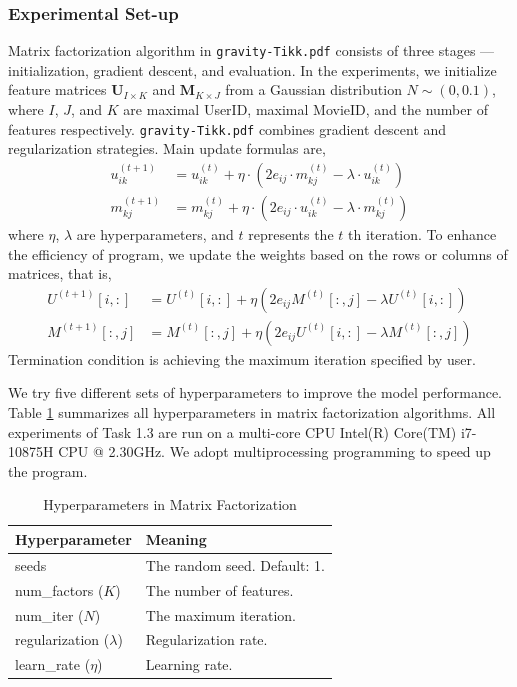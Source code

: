 \documentclass{article}
\begin{document}
\subsubsection{Experimental Set-up}
Matrix factorization algorithm in \texttt{gravity-Tikk.pdf} consists of three stages --- initialization, gradient descent, and evaluation. In the experiments, we initialize feature matrices $\mathbf{U}_{I\times K}$ and $\mathbf{M}_{K\times J}$ from a Gaussian distribution $N\sim (0, 0.1)$, where $I$, $J$, and $K$ are maximal UserID, maximal MovieID, and the number of features respectively. \texttt{gravity-Tikk.pdf} combines gradient descent and regularization strategies. Main update formulas are,
\begin{align*}
    u_{ik}^{(t+1)} &= u_{ik}^{(t)} + \eta\cdot\left( 2e_{ij}\cdot m_{kj}^{(t)} - \lambda\cdot u_{ik}^{(t)} \right) \\
    m_{kj}^{(t+1)} &= m_{kj}^{(t)} + \eta\cdot\left( 2e_{ij}\cdot u_{ik}^{(t)} - \lambda \cdot m_{kj}^{(t)} \right) 
\end{align*}
where $\eta$, $\lambda$ are hyperparameters, and $t$ represents the $t$ th iteration. To enhance the efficiency of program, we update the weights based on the rows or columns of matrices, that is,
\begin{align*}
    U^{(t+1)}[i, :] &= U^{(t)}[i, :] + \eta\left( 2e_{ij}M^{(t)}[:, j] - \lambda U^{(t)}[i, :] \right) \\
    M^{(t+1)}[:, j] &= M^{(t)}[:, j] + \eta\left( 2e_{ij}U^{(t)}[i, :] - \lambda M^{(t)}[:, j] \right) 
\end{align*}
Termination condition is achieving the maximum iteration specified by user.\par
We try five different sets of hyperparameters to improve the model performance. Table \ref{tab:1.3-hyper} summarizes all hyperparameters in matrix factorization algorithms. All experiments of Task 1.3 are run on a multi-core CPU Intel(R) Core(TM) i7-10875H CPU @ 2.30GHz. We adopt multiprocessing programming to speed up the program.
\begin{table}[ht]
    \centering
    \caption{Hyperparameters in Matrix Factorization}
    \label{tab:1.3-hyper}
    \begin{tabular}{ll}
        \toprule
        \textbf{Hyperparameter} & \textbf{Meaning}\\
        \midrule
        seeds & The random seed. Default: 1.\\
        num\_factors ($K$) & The number of features.\\
        num\_iter ($N$) & The maximum iteration.\\
        regularization ($\lambda$) & Regularization rate.\\
        learn\_rate ($\eta$) & Learning rate.\\
        \bottomrule
    \end{tabular}
\end{table}
\end{document}

